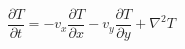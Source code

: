 \documentclass[preview]{standalone}
\begin{document}
\setcounter{equation}{7}
\begin{equation}
    \frac{\partial T}{\partial t} = -v_x \frac{\partial T}{\partial x} -v_y \frac{\partial T}{\partial y} + \nabla^2 T
\end{equation}
\end{document}

